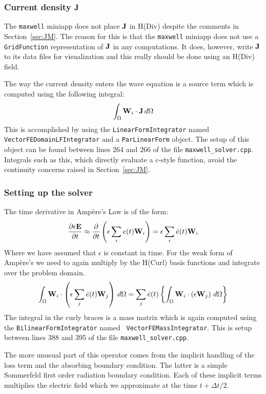 \documentclass[12pt]{article}
\providecommand{\E}{\mbox{\bf E}}
\providecommand{\J}{\mbox{\bf J}}
\providecommand{\W}{\mbox{\bf W}}
\newcommand{\refSec}[1]{Section~\ref{sec:#1}}
\begin{document}
\subsubsection{Current density $\J$}

The {\tt maxwell} miniapp does not place $\J$ in H(Div) despite the
comments in \refSec{JM}. The reason for this is that the {\tt maxwell}
miniapp does not use a {\tt GridFunction} representation of $\J$ in
any computations. It does, however, write $\J$ to its data files for
visualization and this really should be done using an H(Div) field.

The way the current density enters the wave equation is a source term
which is computed using the following integral:
\[
\int_\Omega\W_i\cdot\J\,d\Omega
\]
This is accomplished by using the {\tt LinearFormIntegrator} named
{\tt VectorFEDomainLFIntegrator} and a {\tt ParLinearForm} object. The
setup of this object can be found between lines 264 and 266 of the
file {\tt maxwell\_solver.cpp}. Integrals such as this, which directly
evaluate a c-style function, avoid the continuity concerns raised in
\refSec{JM}.

\subsubsection{Setting up the solver}

The time derivative in Amp\`ere's Law is of the form:
\begin{equation*}
  \frac{\partial\epsilon\E}{\partial t}
  \approx \frac{\partial}{\partial t}\left(\epsilon\sum_ie(t)\W_i\right)
  = \epsilon\sum_i\dot{e}(t)\W_i
\end{equation*}
Where we have assumed that $\epsilon$ is constant in time. For the
weak form of Amp\`ere's we need to again multiply by the H(Curl) basis
functions and integrate over the problem domain.
\[
\int_\Omega\W_i\cdot\left(\epsilon\sum_j\dot{e}(t)\W_j\right)\,d\Omega
= \sum_j\dot{e}(t)\left\{\int_\Omega\W_i\cdot\left(\epsilon\W_j\right)\,d\Omega
\right\}
\]
The integral in the curly braces is a mass matrix which is again
computed using the {\tt BilinearFormIntegrator} named {\tt
  VectorFEMassIntegrator}. This is setup between lines 388 and 395 of
the file {\tt maxwell\_solver.cpp}.

The more unusual part of this operator comes from the implicit
handling of the loss term and the absorbing boundary condition. The
latter is a simple Sommerfeld first order radiation boundary
condition. Each of these implicit terms multiplies the electric field
which we approximate at the time $t+\Delta t/2$.
\end{document}
